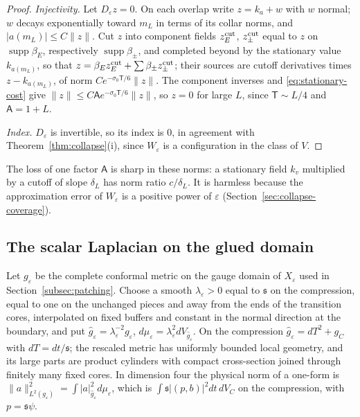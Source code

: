 \documentclass[11pt]{amsart}
\theoremstyle{definition}
\theoremstyle{remark}
\theoremstyle{plain}
\numberwithin{equation}{section}
\newcommand{\eps}{\varepsilon}
\begin{document}
\begin{proof}
\emph{Injectivity.} Let $D_\eps z=0$. On each overlap write $z=k_{a}+w$ with $w$
normal; $w$ decays exponentially toward $m_L$ in terms of its collar norms, and
$|a(m_L)|\le C\|z\|$. Cut $z$ into component fields $z_E^{\rm cut}$, $z_\pm^{\rm cut}$
equal to $z$ on $\operatorname{supp}\beta_E$, respectively
$\operatorname{supp}\beta_\pm$, and completed beyond by the stationary value
$k_{a(m_L)}$, so that $z=\beta_Ez_E^{\rm cut}+\sum\beta_\pm z_\pm^{\rm cut}$; their sources are cutoff derivatives times
$z-k_{a(m_L)}$, of norm $Ce^{-\sigma_0\mathsf T/6}\|z\|$. The component inverses and
\eqref{eq:stationary-cost} give $\|z\|\le C\mathsf Ae^{-\sigma_0\mathsf T/6}\|z\|$, so $z=0$ for large $L$,
since $\mathsf T\sim L/4$ and $\mathsf A=1+L$.

\emph{Index.} $D_\eps$ is invertible, so its index is $0$, in agreement with
Theorem~\ref{thm:collapse}(i), since $W_\eps$ is a configuration in the class of
$V$.
\end{proof}

The loss of one factor $\mathsf A$ is sharp in these norms: a stationary field $k_v$
multiplied by a cutoff of slope $\delta_L$ has norm ratio $c/\delta_L$. It is harmless
because the approximation error of $W_\eps$ is a positive power of $\eps$
(Section~\ref{sec:collapse-coverage}).

\subsection{The scalar Laplacian on the glued domain}\label{subsec:scalar}

Let $g_\eps$ be the complete
conformal metric on the gauge domain of $X_\eps$ used in
Section~\ref{subsec:patching}. Choose a smooth $\lambda_\eps>0$ equal to ${\mathfrak s}$
on the compression, equal to one on the unchanged pieces and away from the
ends of the transition cores, interpolated on fixed buffers and constant in
the normal direction at the boundary, and put $\widehat g_\eps=\lambda_\eps^{-2}g_\eps$,
$d\mu_\eps=\lambda_\eps^2dV_{\widehat g_\eps}$. On the compression
$\widehat g_\eps=dT^2+g_C$ with $dT=dt/{\mathfrak s}$; the rescaled metric has uniformly
bounded local geometry, and its large parts are product cylinders with
compact cross-section joined through finitely many fixed cores. In
dimension four the physical norm of a one-form is
$\|a\|^2_{L^2(g_\eps)}=\int|a|^2_{\widehat g_\eps}d\mu_\eps$, which is
$\int{\mathfrak s}|(p,b)|^2dt\,dV_C$ on the compression, with $p={\mathfrak s}\psi$.
\end{document}

